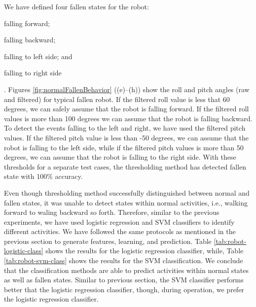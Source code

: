 \documentclass[letterpaper]{article}
\begin{document}
We have defined four fallen states for the robot: \begin{inparaenum}[(1)] \item falling
forward; \item falling backward; \item falling to left side; and \item falling to right
side\end{inparaenum}. Figures \ref{fig:normalFallenBehavior} ((e)--(h)) show the roll and pitch 
angles (raw and filtered) for typical fallen robot. If the filtered roll value is less that 60 
degrees, we can safely assume that the robot is falling forward. If the filtered roll values is 
more than 100 degrees we can assume that the robot is falling backward. To detect the events 
falling to the left and right, we have used the filtered pitch values. If the filtered pitch value 
is less than -50 degrees, we can assume that the robot is falling to the left side, while if the 
filtered pitch values is more than 50 degrees, we can assume that the robot is falling to the right 
side. With these thresholds for a separate test cases, the thresholding method has detected fallen 
state with 100\% accuracy. 


Even though thresholding method successfully distinguished between normal and fallen states, it was 
unable to detect states within normal activities, i.e., walking forward to waling backward so 
forth. Therefore, similar to the previous experiments, we have used logistic regression and SVM 
classifiers to identify different activities. We have followed the same protocols as mentioned in 
the previous section to generate features, learning, and prediction. Table 
\ref{tab:robot-logistic-class} shows the results for the logistic regression classifier, while, 
Table \ref{tab:robot-svm-class} shows the results for the SVM classification. We conclude that the 
classification methods are able to predict activities within normal states as well as fallen 
states. Similar to previous section, the SVM classifier performs better that the logistic 
regression classifier, though, during operation, we prefer the logistic regression classifier.   
\end{document}
